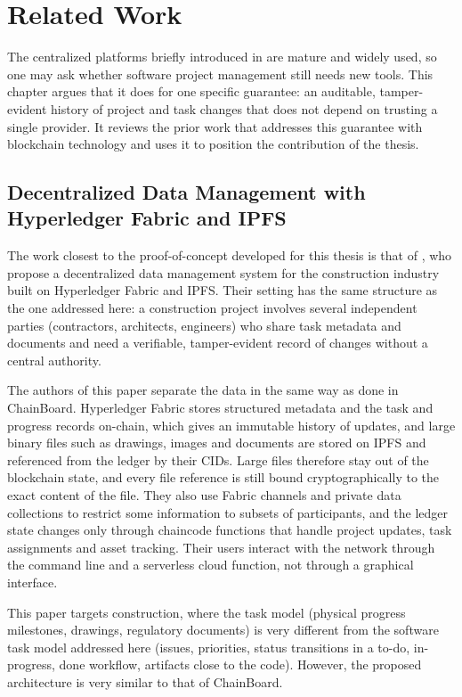\chapter{Related Work}
\label{ch:related}

The centralized platforms briefly introduced in  are mature and widely used, so one may ask whether software project management still needs new tools. This chapter argues that it does for one specific guarantee: an auditable, tamper-evident history of project and task changes that does not depend on trusting a single provider. It reviews the prior work that addresses this guarantee with blockchain technology and uses it to position the contribution of the thesis.

\section{Decentralized Data Management with Hyperledger Fabric and IPFS}
\label{sec:adel}

The work closest to the proof-of-concept developed for this thesis is that of \textcite{adel2023}, who propose a decentralized data management system for the construction industry built on Hyperledger Fabric and IPFS. Their setting has the same structure as the one addressed here: a construction project involves several independent parties (contractors, architects, engineers) who share task metadata and documents and need a verifiable, tamper-evident record of changes without a central authority.

The authors of this paper separate the data in the same way as done in ChainBoard. Hyperledger Fabric stores structured metadata and the task and progress records on-chain, which gives an immutable history of updates, and large binary files such as drawings, images and documents are stored on IPFS and referenced from the ledger by their CIDs. Large files therefore stay out of the blockchain state, and every file reference is still bound cryptographically to the exact content of the file. They also use Fabric channels and private data collections to restrict some information to subsets of participants, and the ledger state changes only through chaincode functions that handle project updates, task assignments and asset tracking. Their users interact with the network through the command line and a serverless cloud function, not through a graphical interface.

This paper targets construction, where the task model (physical progress milestones, drawings, regulatory documents) is very different from the software task model addressed here (issues, priorities, status transitions in a to-do, in-progress, done workflow, artifacts close to the code). However, the proposed architecture is very similar to that of ChainBoard.

